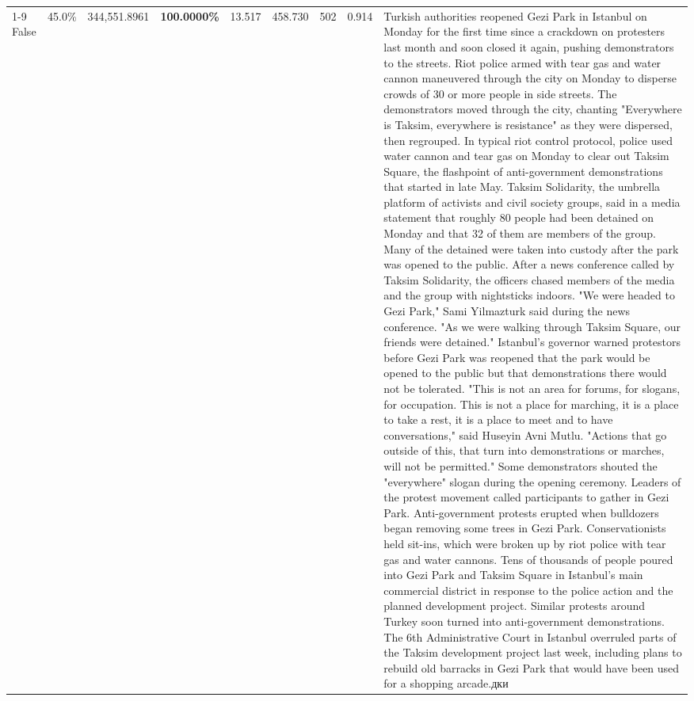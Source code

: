 \begin{table}[H]
\begin{tabular}{lllrlllll}
\cline{1-9}
False & 45.0\% & 344,551.8961 & \bfseries \color{red} 100.0000\% & 13.517 & 458.730 & 502 & 0.914 & Turkish authorities reopened Gezi Park in Istanbul on Monday for the first time since a crackdown on protesters last month and soon closed it again, pushing demonstrators to the streets. Riot police armed with tear gas and water cannon maneuvered through the city on Monday to disperse crowds of 30 or more people in side streets. The demonstrators moved through the city, chanting "Everywhere is Taksim, everywhere is resistance" as they were dispersed, then regrouped. In typical riot control protocol, police used water cannon and tear gas on Monday to clear out Taksim Square, the flashpoint of anti-government demonstrations that started in late May. Taksim Solidarity, the umbrella platform of activists and civil society groups, said in a media statement that roughly 80 people had been detained on Monday and that 32 of them are members of the group. Many of the detained were taken into custody after the park was opened to the public. After a news conference called by Taksim Solidarity, the officers chased members of the media and the group with nightsticks indoors. "We were headed to Gezi Park," Sami Yilmazturk said during the news conference. "As we were walking through Taksim Square, our friends were detained." Istanbul's governor warned protestors before Gezi Park was reopened that the park would be opened to the public but that demonstrations there would not be tolerated. "This is not an area for forums, for slogans, for occupation. This is not a place for marching, it is a place to take a rest, it is a place to meet and to have conversations," said Huseyin Avni Mutlu. "Actions that go outside of this, that turn into demonstrations or marches, will not be permitted." Some demonstrators shouted the "everywhere" slogan during the opening ceremony. Leaders of the protest movement called participants to gather in Gezi Park. Anti-government protests erupted when bulldozers began removing some trees in Gezi Park. Conservationists held sit-ins, which were broken up by riot police with tear gas and water cannons. Tens of thousands of people poured into Gezi Park and Taksim Square in Istanbul's main commercial district in response to the police action and the planned development project. Similar protests around Turkey soon turned into anti-government demonstrations. The 6th Administrative Court in Istanbul overruled parts of the Taksim development project last week, including plans to rebuild old barracks in Gezi Park that would have been used for a shopping arcade.дки \\

\end{tabular}
\end{table}
